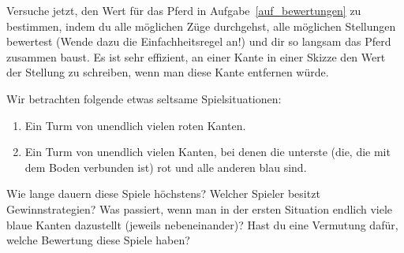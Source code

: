 \documentclass{zirkelbrief1516}
\begin{document}
\begin{aufgabe}
 Versuche jetzt, den Wert für das Pferd in Aufgabe~\ref{auf_bewertungen} zu bestimmen, indem du alle möglichen Züge durchgehst, alle möglichen Stellungen bewertest (Wende dazu die Einfachheitsregel an!) und dir so langsam das Pferd zusammen baust. Es ist sehr effizient, an einer Kante in einer Skizze den Wert der Stellung zu schreiben, wenn man diese Kante entfernen würde.
\end{aufgabe}

\begin{aufgabe}
Wir betrachten folgende etwas seltsame Spielsituationen:
\begin{enumerate}
\item Ein Turm von unendlich vielen roten Kanten.
\item Ein Turm von unendlich vielen Kanten, bei denen die unterste (die, die mit dem Boden verbunden ist) rot und alle anderen blau sind.
\end{enumerate}
Wie lange dauern diese Spiele höchstens? Welcher Spieler besitzt Gewinnstrategien? Was passiert, wenn man in der ersten Situation endlich viele blaue Kanten dazustellt (jeweils nebeneinander)? Hast du eine Vermutung dafür, welche Bewertung diese Spiele haben?
\end{aufgabe}
\end{document}
